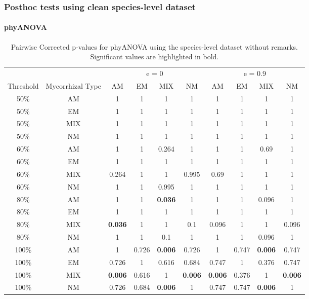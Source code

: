 \documentclass[]{article}
\let\oldparagraph\paragraph
\renewcommand{\paragraph}[1]{\oldparagraph{#1}\mbox{}}
\begin{document}
\hypertarget{posthoc-tests-using-clean-species-level-dataset}{%
\subsubsection{Posthoc tests using clean species-level
dataset}\label{posthoc-tests-using-clean-species-level-dataset}}

\hypertarget{phyanova-1}{%
\paragraph{phyANOVA}\label{phyanova-1}}

\begin{table}[H]

\caption{\label{tab:unnamed-chunk-6}Pairwise Corrected p-values for phyANOVA using the species-level dataset without remarks. Significant values are highlighted in bold.}
\centering
\begin{tabular}{c|c|c|c|c|c|c|c|c|c}
\hline
\multicolumn{2}{c|}{ } & \multicolumn{4}{c|}{e = 0} & \multicolumn{4}{c}{e = 0.9} \\
\cline{3-6} \cline{7-10}
Threshold & Mycorrhizal Type & AM & EM & MIX & NM & AM & EM & MIX & NM\\
\hline
50\% & AM & 1 & 1 & 1 & 1 & 1 & 1 & 1 & 1\\
\hline
50\% & EM & 1 & 1 & 1 & 1 & 1 & 1 & 1 & 1\\
\hline
50\% & MIX & 1 & 1 & 1 & 1 & 1 & 1 & 1 & 1\\
\hline
50\% & NM & 1 & 1 & 1 & 1 & 1 & 1 & 1 & 1\\
\hline
60\% & AM & 1 & 1 & 0.264 & 1 & 1 & 1 & 0.69 & 1\\
\hline
60\% & EM & 1 & 1 & 1 & 1 & 1 & 1 & 1 & 1\\
\hline
60\% & MIX & 0.264 & 1 & 1 & 0.995 & 0.69 & 1 & 1 & 1\\
\hline
60\% & NM & 1 & 1 & 0.995 & 1 & 1 & 1 & 1 & 1\\
\hline
80\% & AM & 1 & 1 & \textbf{0.036} & 1 & 1 & 1 & 0.096 & 1\\
\hline
80\% & EM & 1 & 1 & 1 & 1 & 1 & 1 & 1 & 1\\
\hline
80\% & MIX & \textbf{0.036} & 1 & 1 & 0.1 & 0.096 & 1 & 1 & 0.096\\
\hline
80\% & NM & 1 & 1 & 0.1 & 1 & 1 & 1 & 0.096 & 1\\
\hline
100\% & AM & 1 & 0.726 & \textbf{0.006} & 0.726 & 1 & 0.747 & \textbf{0.006} & 0.747\\
\hline
100\% & EM & 0.726 & 1 & 0.616 & 0.684 & 0.747 & 1 & 0.376 & 0.747\\
\hline
100\% & MIX & \textbf{0.006} & 0.616 & 1 & \textbf{0.006} & \textbf{0.006} & 0.376 & 1 & \textbf{0.006}\\
\hline
100\% & NM & 0.726 & 0.684 & \textbf{0.006} & 1 & 0.747 & 0.747 & \textbf{0.006} & 1\\
\hline
\end{tabular}
\end{table}
\end{document}

